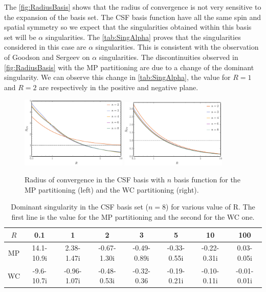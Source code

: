 \documentclass[11pt,a4paper]{article}
\begin{document}
The \autoref{fig:RadiusBasis} shows that the radius of convergence is not very sensitive to the expansion of the basis set. The CSF basis function have all the same spin and spatial symmetry so we expect that the singularities obtained within this basis set will be $\alpha$ singularities. The \autoref{tab:SingAlpha} proves that the singularities considered in this case are $\alpha$ singularities. This is consistent with the observation of Goodson and Sergeev \cite{Goodson_2004} on $\alpha$ singularities. The discontinuities observed in \autoref{fig:RadiusBasis} with the MP partitioning are due to a change of the dominant singularity. We can observe this change in \autoref{tab:SingAlpha}, the value for $R=1$ and $R=2$ are respectively in the positive and negative plane.

\begin{figure}[h!]
    \centering
    \includegraphics[width=0.45\textwidth]{MPlargebasis.pdf}
    \includegraphics[width=0.45\textwidth]{WCElargebasis.pdf}
    \caption{\centering Radius of convergence in the CSF basis with $n$ basis function for the MP partitioning (left) and the WC partitioning (right).}
    \label{fig:RadiusBasis}
\end{figure}

\begin{table}[h!]
\centering
\caption{\centering Dominant singularity in the CSF basis set ($n=8$) for various value of R. The first line is the value for the MP partitioning and the second for the WC one.}
\begin{tabular}{cccccccc}
\hline
\hline
$R$ & 0.1 & 1 & 2 & 3 & 5 & 10 & 100 \\
\hline
MP & 14.1-10.9i & 2.38-1.47i & -0.67-1.30i & -0.49-0.89i & -0.33-0.55i & -0.22-0.31i & 0.03-0.05i \\
WC & -9.6-10.7i & -0.96-1.07i & -0.48-0.53i & -0.32-0.36 & -0.19-0.21i & -0.10-0.11i & -0.01-0.01i \\
\hline
\hline
\end{tabular}
\label{tab:SingAlpha}
\end{table}
\end{document}
